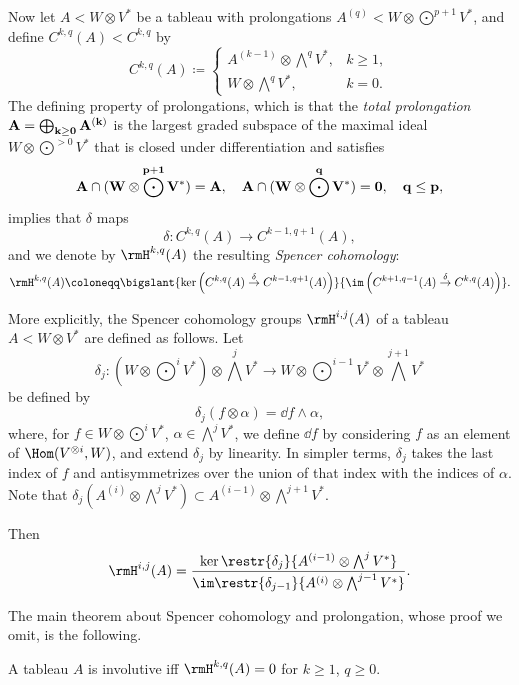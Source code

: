 Now let $A<W\otimes V^\ast$ be a tableau with prolongations $A^{(q)}<W\otimes \bigodot^{p+1}V^\ast$, and define $C^{k,q}(A)<C^{k,q}$ by 
\[C^{k,q}(A)\coloneqq \begin{cases}
    A^{(k-1)}\otimes\bigwedge^q V^\ast,& k\geq 1,\\
    W\otimes\bigwedge^q V^\ast,& k=0.
\end{cases}\]
The defining property of prolongations, which is that the \emph{total prolongation} $\bf{A}=\bigoplus_{k\geq 0} A^{(k)}$ is the largest graded subspace of the maximal ideal $W\otimes \bigodot^{>0}V^\ast$ that is closed under differentiation and satisfies \[\bf{A}\cap (W\otimes \bigodot^{p+1}V^\ast)=A,\quad \bf{A}\cap (W\otimes\bigodot^q V^\ast)=0,\quad q\leq p,\]
implies that $\delta$ maps
\[\delta:C^{k,q}(A)\to C^{k-1,q+1}(A),\]
and we denote by $\rmH^{k,q}(A)$ the resulting \emph{Spencer cohomology}:
\[\rmH^{k,q}(A)\coloneqq \bigslant{\ker\left(C^{k,q}(A)\overset{\delta}{\to}C^{k-1,q+1}(A)\right)}{\im \left(C^{k+1,q-1}(A)\overset{\delta}{\to}C^{k,q}(A)\right)}.\]

\begin{rem}
    More explicitly, the Spencer cohomology groups $\rmH^{i,j}(A)$ of a tableau $A<W\otimes V^\ast$ are defined as follows. Let 
    \[\delta_j:(W\otimes \bigodot^iV^\ast)\otimes \bigwedge^j V^\ast\to W\otimes \bigodot^{i-1}V^\ast\otimes \bigwedge^{j+1}V^\ast\]
    be defined by 
    \[\delta_j(f\otimes \alpha)=\dd f\wedge \alpha,\]
    where, for $f\in W\otimes \bigodot^i V^\ast$, $\alpha\in \bigwedge^j V^\ast$, we define $\dd f$ by considering $f$ as an element of $\Hom(V^{\otimes i},W)$, and extend $\delta_j$ by linearity. In simpler terms, $\delta_j$ takes the last index of $f$ and antisymmetrizes over the union of that index with the indices of $\alpha$. Note that $\delta_j(A^{(i)}\otimes \bigwedge^j V^\ast)\subset A^{(i-1)}\otimes\bigwedge^{j+1}V^\ast$.

    Then 
    \[\rmH^{i,j}(A)= \frac{\ker\restr{\delta_j}{A^{(i-1)}\otimes \bigwedge^jV^\ast}}{\im \restr{\delta_{j-1}}{A^{(i)}\otimes \bigwedge^{j-1}V^\ast}}.\]
\end{rem}

The main theorem about Spencer cohomology and prolongation, whose proof we omit, is the following.

\begin{thm}
    A tableau $A$ is involutive iff $\rmH^{k,q}(A)=0$ for $k\geq 1$, $q\geq 0$.
\end{thm}

